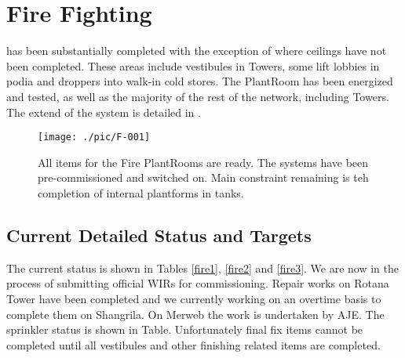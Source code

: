 
\chapter{Fire Fighting}


 has been substantially
completed with the exception of where ceilings have not been completed. These areas include vestibules in Towers, some lift lobbies in podia and droppers into walk-in cold stores. The
PlantRoom has been energized and tested, as well as the majority of the rest of the network, including Towers. The extend of the system is detailed in .

\begin{figure*}
\texttt{[image: ./pic/F-001]}
\caption{All items for the Fire PlantRooms are ready. The systems have been pre-commissioned and
switched on. Main constraint remaining is teh completion of internal plantforms in tanks.}
\end{figure*}
 

\section{Current Detailed Status and Targets}

The current status is shown in Tables \ref{fire1}, \ref{fire2} and \ref{fire3}. We are now in the process of submitting official WIRs for commissioning. Repair works on Rotana Tower have been completed and we currently working on an overtime basis to complete them on Shangrila. On Merweb the work is undertaken by AJE. The sprinkler status is shown in Table. Unfortunately final fix items cannot be completed until all vestibules and other finishing related items are completed.

